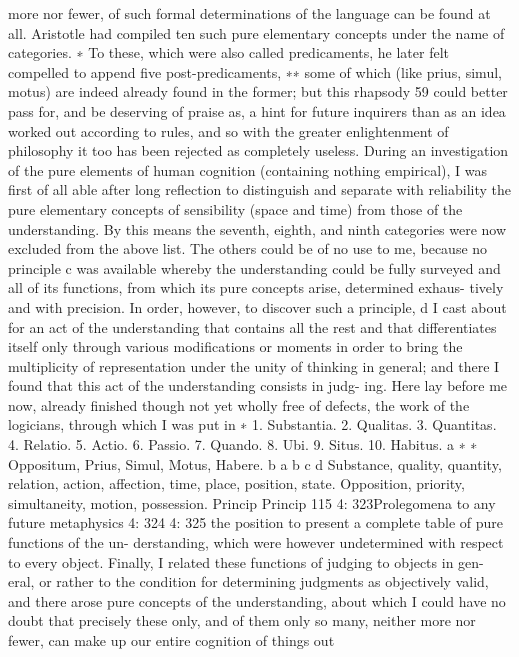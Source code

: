 more nor fewer, of such formal determinations of the language can be
found at all.
Aristotle had compiled ten such pure elementary concepts under the
name of categories. ∗ To these, which were also called predicaments, he
later felt compelled to append ﬁve post-predicaments, ∗∗ some of which
(like prius, simul, motus) are indeed already found in the former; but this
rhapsody 59 could better pass for, and be deserving of praise as, a hint for
future inquirers than as an idea worked out according to rules, and so
with the greater enlightenment of philosophy it too has been rejected as
completely useless.
During an investigation of the pure elements of human cognition
(containing nothing empirical), I was ﬁrst of all able after long reﬂection
to distinguish and separate with reliability the pure elementary concepts
of sensibility (space and time) from those of the understanding. By this
means the seventh, eighth, and ninth categories were now excluded from
the above list. The others could be of no use to me, because no principle c
was available whereby the understanding could be fully surveyed and all
of its functions, from which its pure concepts arise, determined exhaus-
tively and with precision.
In order, however, to discover such a principle, d I cast about for an
act of the understanding that contains all the rest and that differentiates
itself only through various modiﬁcations or moments in order to bring
the multiplicity of representation under the unity of thinking in general;
and there I found that this act of the understanding consists in judg-
ing. Here lay before me now, already ﬁnished though not yet wholly
free of defects, the work of the logicians, through which I was put in
∗
1. Substantia. 2. Qualitas. 3. Quantitas. 4. Relatio. 5. Actio. 6. Passio. 7. Quando.
8. Ubi. 9. Situs. 10. Habitus. a
∗ ∗ Oppositum, Prius, Simul, Motus, Habere. b
a
b
c
d
Substance, quality, quantity, relation, action, affection, time, place, position, state.
Opposition, priority, simultaneity, motion, possession.
Princip
Princip
115
4: 323Prolegomena to any future metaphysics
4: 324
4: 325
the position to present a complete table of pure functions of the un-
derstanding, which were however undetermined with respect to every
object. Finally, I related these functions of judging to objects in gen-
eral, or rather to the condition for determining judgments as objectively
valid, and there arose pure concepts of the understanding, about which I
could have no doubt that precisely these only, and of them only so many,
neither more nor fewer, can make up our entire cognition of things out
